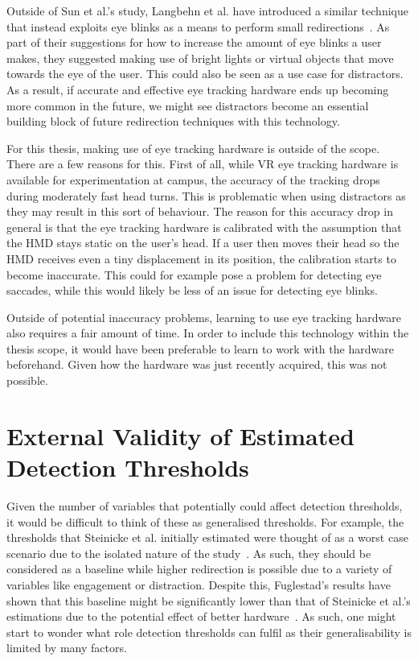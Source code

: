 Outside of Sun et al.'s study, Langbehn et al. have introduced a similar technique that instead exploits eye blinks as a means to perform small redirections~\cite{langbehn2018blink}. As part of their suggestions for how to increase the amount of eye blinks a user makes, they suggested making use of bright lights or virtual objects that move towards the eye of the user. This could also be seen as a use case for distractors. As a result, if accurate and effective eye tracking hardware ends up becoming more common in the future, we might see distractors become an essential building block of future redirection techniques with this technology. 

For this thesis, making use of eye tracking hardware is outside of the scope. There are a few reasons for this. First of all, while VR eye tracking hardware is available for experimentation at campus, the accuracy of the tracking drops during moderately fast head turns. This is problematic when using distractors as they may result in this sort of behaviour. The reason for this accuracy drop in general is that the eye tracking hardware is calibrated with the assumption that the HMD stays static on the user's head. If a user then moves their head so the HMD receives even a tiny displacement in its position, the calibration starts to become inaccurate. This could for example pose a problem for detecting eye saccades, while this would likely be less of an issue for detecting eye blinks. 

Outside of potential inaccuracy problems, learning to use eye tracking hardware also requires a fair amount of time. In order to include this technology within the thesis scope, it would have been preferable to learn to work with the hardware beforehand. Given how the hardware was just recently acquired, this was not possible.

\section{External Validity of Estimated Detection Thresholds}
Given the number of variables that potentially could affect detection thresholds, it would be difficult to think of these as generalised thresholds. For example, the thresholds that Steinicke et al. initially estimated were thought of as a worst case scenario due to the isolated nature of the study~\cite{5072212}. As such, they should be considered as a baseline while higher redirection is possible due to a variety of variables like engagement or distraction. Despite this, Fuglestad's results have shown that this baseline might be significantly lower than that of Steinicke et al.'s estimations due to the potential effect of better hardware~\cite{fuglestad2018redirected}. As such, one might start to wonder what role detection thresholds can fulfil as their generalisability is limited by many factors.  

